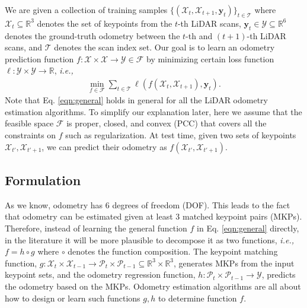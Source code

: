 \documentclass[sigconf]{acmart}
\def\ie{\emph{i.e., }}
\def\lidar{LiDAR}
\begin{document}
We are given a collection of training samples $\{(\mathcal{X}_t, \mathcal{X}_{t+1}, \mathbf{y}_{t})\}_{t\in\mathcal{T}}$ where $\mathcal{X}_t\subseteq\mathbb{R}^3$ denotes the set of keypoints from the $t$-th \lidar{} scans, $\mathbf{y}_{t}\in\mathcal{Y}\subseteq\mathbb{R}^6$ denotes the ground-truth odometry between the $t$-th and $(t+1)$-th \lidar{} scans, and $\mathcal{T}$ denotes the scan index set. Our goal is to learn an odometry prediction function $f:\mathcal{X}\times\mathcal{X}\rightarrow\mathcal{Y}\in\mathcal{F}$ by minimizing certain loss function $\ell:\mathcal{Y}\times\mathcal{Y}\rightarrow\mathbb{R}$, \ie
\begin{align}\label{eqn:general}
    \min_{f\in\mathcal{F}}\sum_{t\in\mathcal{T}}\ell(f(\mathcal{X}_t, \mathcal{X}_{t+1}), \mathbf{y}_{t}).
\end{align}
Note that Eq. \ref{eqn:general} holds in general for all the \lidar{} odometry estimation algorithms. To simplify our explanation later, here we assume that the feasible space $\mathcal{F}$ is proper, closed, and convex (PCC) that covers all the constraints on $f$ such as regularization. At test time, given two sets of keypoints $\mathcal{X}_{t'}, \mathcal{X}_{t'+1}$, we can predict their odometry as $f(\mathcal{X}_{t'}, \mathcal{X}_{t'+1})$.


\subsection{Formulation}

As we know, odometry has 6 degrees of freedom (DOF). This leads to the fact that odometry can be estimated given at least 3 matched keypoint pairs (MKPs). Therefore, instead of learning the general function $f$ in Eq. \ref{eqn:general} directly, in the literature it will be more plausible to decompose it as two functions, \ie $f=h\circ g$ where $\circ$ denotes the function composition. The keypoint matching function, $g:\mathcal{X}_t\times\mathcal{X}_{t-1}\rightarrow\mathcal{P}_{t}\times\mathcal{P}_{t-1}\subseteq\mathbb{R}^3\times\mathbb{R}^3$, generates MKPs from the input keypoint sets, and the odometry regression function, $h:\mathcal{P}_t\times\mathcal{P}_{t-1}\rightarrow\mathcal{Y}$, predicts the odometry based on the MKPs. Odometry estimation algorithms are all about how to design or learn such functions $g, h$ to determine function $f$.
\end{document}
